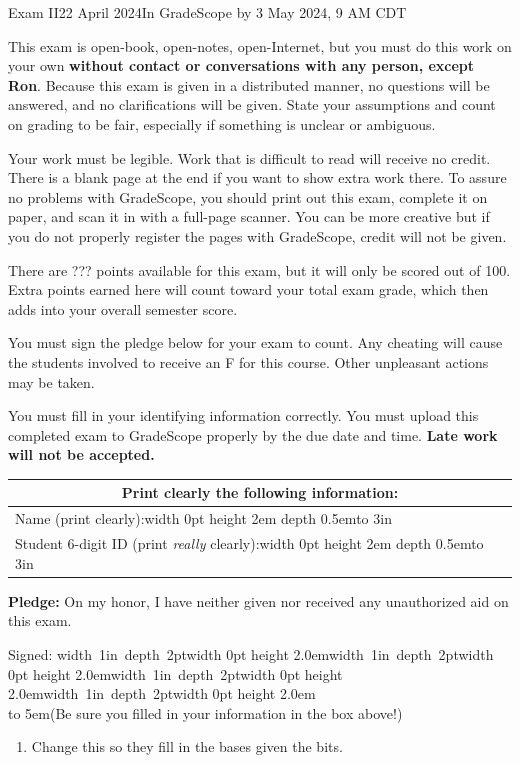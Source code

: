 \documentclass[12pt]{article}
\newcommand{\Blank}[1][1in]{\mbox{\vrule width #1 depth 2pt}\vrule width 0pt height 2.0em}
\def\Tall{\vrule width 0pt height 2em depth 0.5em}
\begin{document}
\begin{assignment}{Exam II}{22 April 2024}{In GradeScope by 3 May 2024, 9 AM CDT}

{\small {\large {}}
This exam is open-book, open-notes, open-Internet, but you must do this
work on your own \textbf{without contact or conversations with any person, except Ron}.  
Because this exam is given in a distributed manner, no questions will be answered, and no clarifications will be given.  State your assumptions and count on grading to be fair, especially if something is unclear or ambiguous.


Your work must be legible.  Work that is
difficult to read will receive no credit.  There is a blank page at the end
if you want to show extra work there.  To assure no problems with GradeScope,
you should
print out this exam, complete it on paper, and scan it in with a full-page
scanner.  You can be more creative but if you do not properly register the
pages with GradeScope, credit will not be given.

There are ??? points available for this exam, but it will only be scored out of 100.  Extra points earned here will count toward your total exam grade, which then adds into your overall semester score.

You must sign the pledge below for your exam to count.  Any cheating will
cause the students involved to receive an F for this course. Other unpleasant
actions
may be taken.

You must fill in your identifying information correctly.  You must upload this
completed exam to GradeScope properly by the due date and time.  \textbf{Late work will not be accepted.}
}

\begin{center}\large
\begin{tabular}{|c|c|c|} \hline
\multicolumn{3}{|c|}{{\bf Print  clearly} the following information:}  \\ \hline
\multicolumn{3}{|l|}{Name (print clearly):\Tall{}\hbox to 3in{\hss}}  \\ \hline
\multicolumn{3}{|l|}{Student 6-digit ID (print {\it really} clearly):\Tall{}\hbox to 3in{\hss}} \\ \hline
\end{tabular}
\end{center}

{\bf Pledge:} On my honor, I have neither
given nor received any unauthorized aid on this exam.

Signed:  \Blank\Blank\Blank\Blank \\ \hbox to 5em{\hss}(Be 
sure you filled in your information in the box above!)
%
%
%
\clearpage
\begin{enumerate}
\item{} 
Change this so they fill in the bases given the bits.


\end{enumerate}
\end{assignment}
\end{document}
